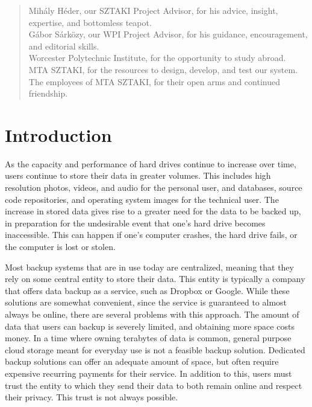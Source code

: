 \documentclass[12pt]{report}
\begin{document}
\renewcommand{\abstractname}{Acknowledgements}
\begin{abstract}
Mih\'aly H\'eder, our SZTAKI Project Advisor, for his advice, insight, expertise, and bottomless teapot.\\

\noindent G\'abor S\'ark\"ozy, our WPI Project Advisor, for his guidance, encouragement, and editorial skills. \\

\noindent Worcester Polytechnic Institute, for the opportunity to study abroad. \\

\noindent MTA SZTAKI, for the resources to design, develop, and test our system. \\

\noindent The employees of MTA SZTAKI, for their open arms and continued friendship.
\end{abstract}

\tableofcontents
\listoffigures

\chapter{Introduction}

As the capacity and performance of hard drives continue to increase over time, users continue to store their data in greater volumes. This includes high resolution photos, videos, and audio for the personal user, and databases, source code repositories, and operating system images for the technical user. The increase in stored data gives rise to a greater need for the data to be backed up, in preparation for the undesirable event that one's hard drive becomes inaccessible. This can happen if one's computer crashes, the hard drive fails, or the computer is lost or stolen.

Most backup systems that are in use today are centralized, meaning that they rely on some central entity to store their data. This entity is typically a company that offers data backup as a service, such as Dropbox or Google. While these solutions are somewhat convenient, since the service is guaranteed to almost always be online, there are several problems with this approach. The amount of data that users can backup is severely limited, and obtaining more space costs money. In a time where owning terabytes of data is common, general purpose cloud storage meant for everyday use is not a feasible backup solution. Dedicated backup solutions can offer an adequate amount of space, but often require expensive recurring payments for their service. In addition to this, users must trust the entity to which they send their data to both remain online and respect their privacy. This trust is not always possible.
\end{document}
